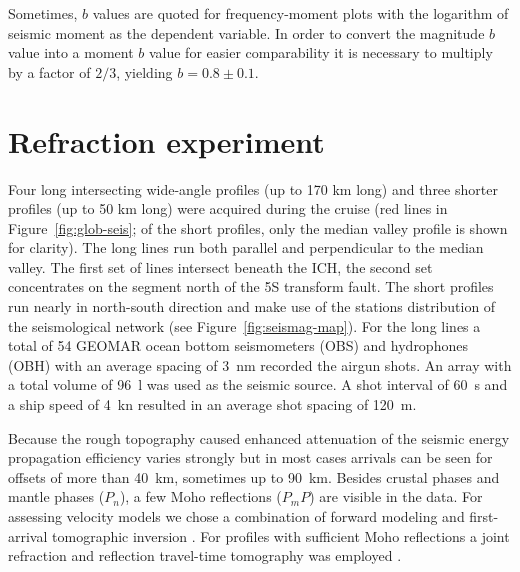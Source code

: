 \documentclass[jgr]{agu2001}
\newlength{\tw}
\begin{document}
\begin{article}
Sometimes, $b$ values are quoted for frequency-moment  plots with 
 the logarithm of seismic moment as the dependent variable. In order to convert the magnitude $b$ value into a
 moment $b$ value for easier comparability it  is necessary to multiply by a factor of $2/3$,
yielding $b=0.8\pm0.1$.

\section{Refraction experiment}

Four long intersecting wide-angle profiles (up to 170 km long) and three
shorter  profiles (up to 50 km long) were acquired during the cruise
(red lines in Figure~\ref{fig:glob-seis}; of the short profiles, only
the median valley profile is shown for clarity).  The long
lines run both parallel and perpendicular to the median valley. 
The first set of lines intersect beneath the ICH, the second set
concentrates on the segment north of the 5\dg S transform fault.
 The short profiles  run nearly in north-south
direction and make use of the stations distribution of the seismological network
(see Figure~\ref{fig:seismag-map}). For the long lines a total of 54 GEOMAR ocean bottom
seismometers (OBS) and hydrophones (OBH) with an average spacing of
3~nm recorded the airgun shots. An array with a total volume of 96~l
was used as the seismic source. A shot interval of 60~s and a ship
speed of 4~kn resulted  in an average  shot spacing of 120~m. 
 
Because the rough topography caused enhanced attenuation of the seismic
energy propagation efficiency varies strongly but in most cases
arrivals can be seen for offsets of more than 40~km, sometimes up to 90~km. Besides crustal phases and
mantle phases ($P_n$),  a few Moho reflections ($P_mP$) are visible in
the data. For assessing velocity models we chose a combination of
forward modeling and first-arrival tomographic inversion \citep{luetgert88,zelt98}. For
profiles with sufficient Moho reflections a joint refraction and
reflection travel-time tomography was employed \citep{korenaga00}.


\end{article}
\end{document}
